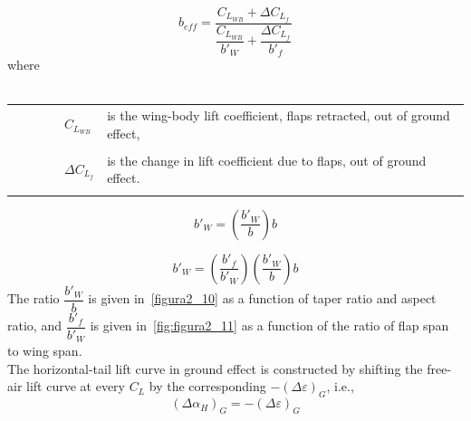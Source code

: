 \begin{equation}
b_{eff}=\frac{ C_{L_{WB}} +\Delta C_{L_f} }{\dfrac{ C_{L_{WB}} }{b'_W}+ \dfrac {\Delta C_{L_f} }{b'_f}}
\label{eq:equazione2_2_1} %
\end{equation}
  \indent \indent \indent  where \\ \\

\begin{tabulary}{1\textwidth}{L L}
\begin{minipage}[T]{4cm}$\qquad \qquad  C_{L_{WB}}$  \end{minipage}&  is the wing-body lift coefficient, flaps retracted, out of ground effect,\\ \\
$\qquad \qquad  \Delta C_{L_f}$ & is the change in lift coefficient due to flaps, out of ground effect. \\ \\
\end{tabulary}

\begin{equation}
b'_W=\left(\frac{b'_W}{b}\right)b
\label{eq:equazione2_3_1} %
\end{equation}

\begin{equation}
b'_W=\left(\frac{b'_f}{b'_W}\right)\left(\frac{b'_W}{b}\right)b
\label{eq:equazione2_3_2} %
\end{equation}
 \indent \indent \indent The ratio $\dfrac{b'_W}{b}$ is given in~\vref{figura2_10} as a function of taper \indent \indent \indent ratio and aspect ratio, and $\dfrac{b'_f}{b'_W}$ is given in~\vref{fig:figura2_11} as   \indent \indent \indent a function of the  ratio  of flap span to wing span.\\
 
The horizontal-tail lift curve in ground effect is constructed by shifting the free-air lift curve at
every $C_L$ by the corresponding \(-\left(\Delta \varepsilon \right)_G\), i.e.,
\begin{equation}
\left(\Delta \alpha_H \right)_G=-\left(\Delta \varepsilon \right)_G
\label{eq:equazione2_3} %
\end{equation}

